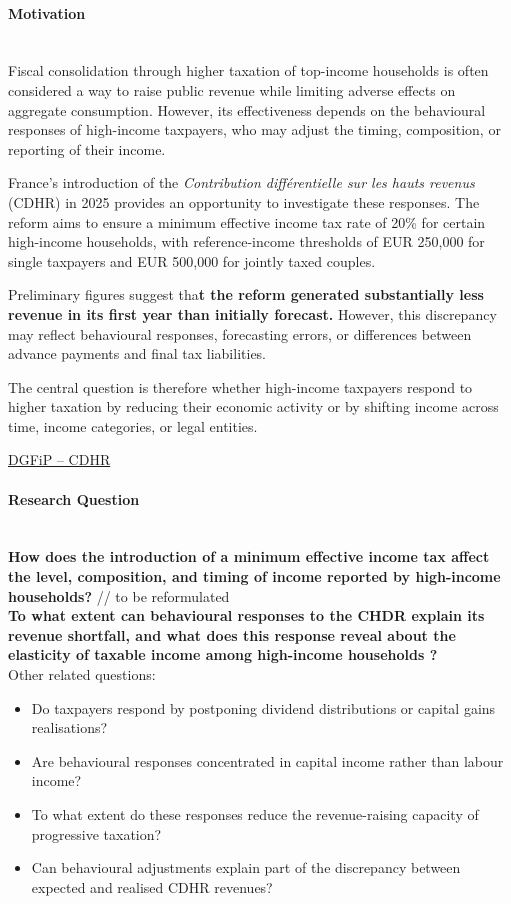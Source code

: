 \documentclass{article}
\begin{document}
\paragraph{Motivation} \\

Fiscal consolidation through higher taxation of top-income households is often considered a way to raise public revenue while limiting adverse effects on aggregate consumption. However, its effectiveness depends on the behavioural responses of high-income taxpayers, who may adjust the timing, composition, or reporting of their income.

France's introduction of the \textit{Contribution différentielle sur les hauts revenus} (CDHR) in 2025 provides an opportunity to investigate these responses. The reform aims to ensure a minimum effective income tax rate of 20\% for certain high-income households, with reference-income thresholds of EUR 250,000 for single taxpayers and EUR 500,000 for jointly taxed couples.

Preliminary figures suggest tha\textbf{t the reform generated substantially less revenue in its first year than initially forecast. }However, this discrepancy may reflect behavioural responses, forecasting errors, or differences between advance payments and final tax liabilities.

The central question is therefore whether high-income taxpayers respond to higher taxation by reducing their economic activity or by shifting income across time, income categories, or legal entities.

\href{https://www.impots.gouv.fr/actualite/contribution-differentielle-sur-les-hauts-revenus-cdhr}{DGFiP -- CDHR}

\paragraph{Research Question} \\

\textbf{How does the introduction of a minimum effective income tax affect the level, composition, and timing of income reported by high-income households?} // to be reformulated \\
\textbf{To what extent can behavioural responses to the CHDR explain its revenue shortfall, and what does this response reveal about the elasticity of taxable income among high-income households ?} \\
\noindent Other related questions: 
\begin{itemize}
    \item Do taxpayers respond by postponing dividend distributions or capital gains realisations?
    \item Are behavioural responses concentrated in capital income rather than labour income?
    \item To what extent do these responses reduce the revenue-raising capacity of progressive taxation?
    \item Can behavioural adjustments explain part of the discrepancy between expected and realised CDHR revenues?
\end{itemize}
\end{document}
